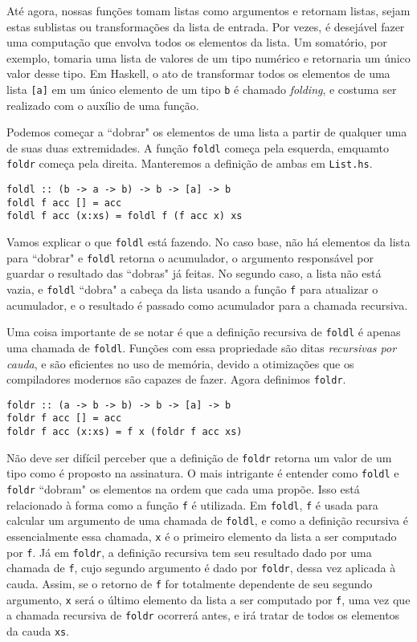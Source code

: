 \documentclass[a4paper]{article}
\begin{document}
Até agora, nossas funções tomam listas como argumentos e retornam listas, sejam estas sublistas ou transformações da lista de entrada.
Por vezes, é desejável fazer uma computação que envolva todos os elementos da lista.
Um somatório, por exemplo, tomaria uma lista de valores de um tipo numérico e retornaria um único valor desse tipo.
Em Haskell, o ato de transformar todos os elementos de uma lista \texttt{[a]} em um único elemento de um tipo \texttt{b} é chamado \emph{folding}, e costuma ser realizado com o auxílio de uma função.

Podemos começar a ``dobrar" os elementos de uma lista a partir de qualquer uma de suas duas extremidades.
A função \texttt{foldl} começa pela esquerda, emquamto \texttt{foldr} começa pela direita.
Manteremos a definição de ambas em \texttt{List.hs}.

\begin{verbatim}
foldl :: (b -> a -> b) -> b -> [a] -> b
foldl f acc [] = acc
foldl f acc (x:xs) = foldl f (f acc x) xs
\end{verbatim}

Vamos explicar o que \texttt{foldl} está fazendo.
No caso base, não há elementos da lista para ``dobrar" e \texttt{foldl} retorna o acumulador, o argumento responsável por guardar o resultado das ``dobras" já feitas.
No segundo caso, a lista não está vazia, e \texttt{foldl} ``dobra" a cabeça da lista usando a função \texttt{f} para atualizar o acumulador, e o resultado é passado como acumulador para a chamada recursiva.

Uma coisa importante de se notar é que a definição recursiva de \texttt{foldl} é apenas uma chamada de \texttt{foldl}.
Funções com essa propriedade são ditas \emph{recursivas por cauda}, e são eficientes no uso de memória, devido a otimizações que os compiladores modernos são capazes de fazer. Agora definimos \texttt{foldr}.

\begin{verbatim}
foldr :: (a -> b -> b) -> b -> [a] -> b
foldr f acc [] = acc
foldr f acc (x:xs) = f x (foldr f acc xs)
\end{verbatim}

Não deve ser difícil perceber que a definição de \texttt{foldr} retorna um valor de um tipo como é proposto na assinatura.
O mais intrigante é entender como \texttt{foldl} e \texttt{foldr} ``dobram" os elementos na ordem que cada uma propõe.
Isso está relacionado à forma como a função \texttt{f} é utilizada.
Em \texttt{foldl}, \texttt{f} é usada para calcular um argumento de uma chamada de \texttt{foldl}, e como a definição recursiva é essencialmente essa chamada, \texttt{x} é o primeiro elemento da lista a ser computado por \texttt{f}.
Já em \texttt{foldr}, a definição recursiva tem seu resultado dado por uma chamada de \texttt{f}, cujo segundo argumento é dado por \texttt{foldr}, dessa vez aplicada à cauda. Assim, se o retorno de \texttt{f} for totalmente dependente de seu segundo argumento, \texttt{x} será o último elemento da lista a ser computado por \texttt{f}, uma vez que a chamada recursiva de \texttt{foldr} ocorrerá antes, e irá tratar de todos os elementos da cauda \texttt{xs}.
\end{document}
